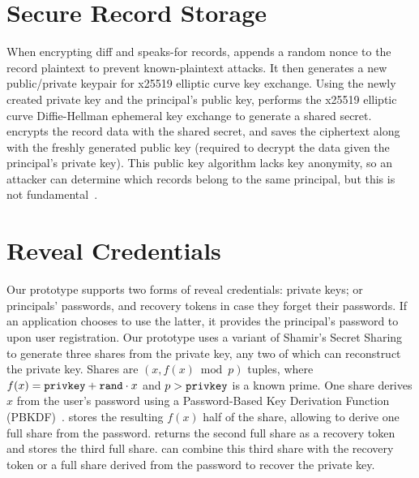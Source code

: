 \section{Secure Record Storage}
%
When encrypting diff and speaks-for records, \sys appends a random nonce to
the record plaintext to prevent known-plaintext attacks.
%
It then generates a new public/private keypair for x25519 elliptic curve key
exchange.
%
Using the newly created private key and the principal's public key, \sys
performs the x25519 elliptic curve Diffie-Hellman ephemeral key exchange to
generate a shared secret.
%
\sys encrypts the record data with the shared secret, and saves the
ciphertext along with the freshly generated public key (required to decrypt
the data given the principal's private key).
%
This public key algorithm lacks key anonymity, so an attacker can determine
which records belong to the same principal, but this is not
fundamental~\cite{anonymous-keys}.

%

\section{Reveal Credentials}
%
Our prototype supports two forms of reveal credentials: \one{} private keys; or
\two{} principals' passwords, and recovery
tokens in case they forget their passwords.
%
If an application chooses to use the latter, it provides the principal's password
to \sys upon user registration.
%
Our prototype uses a variant of Shamir's Secret Sharing~\cite{secretsharing}
to generate three shares from the private key, any two of which can reconstruct the
private key.
%
Shares are $(x, f(x) \bmod p)$ tuples, where $f(x) = \texttt{{privkey}} + \texttt{{rand}} \cdot
x$ and $p > \texttt{{privkey}}$ is a known prime.
%
One share derives $x$ from the user's password using a Password-Based Key
Derivation Function (PBKDF)~\cite{pbkdf-rfc}.
%
\sys stores the resulting $f(x)$ half of the share, allowing \sys to derive one
full share from the password.
%
%
\sys returns the second full share as a recovery token and stores the third full
share.
%
\sys can combine this third share with the recovery token
or a full share derived from the password to recover the
private key.
%

